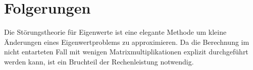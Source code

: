 %
%
%
\section{Folgerungen
\label{ew:section:folgerungen}}

Die Störungstheorie für Eigenwerte ist eine elegante Methode um kleine Änderungen eines Eigenwertproblems zu approximieren.
Da die Berechnung im nicht entarteten Fall mit wenigen Matrixmultiplikationen explizit durchgeführt werden kann, ist ein Bruchteil der Rechenleistung notwendig.


